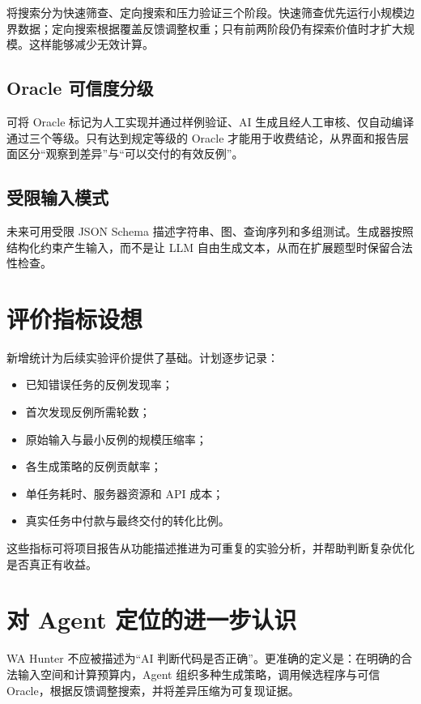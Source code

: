 \documentclass[10pt,a4paper]{ctexart}
\begin{document}
将搜索分为快速筛查、定向搜索和压力验证三个阶段。快速筛查优先运行小规模边界数据；定向搜索根据覆盖反馈调整权重；只有前两阶段仍有探索价值时才扩大规模。这样能够减少无效计算。

\subsection{Oracle 可信度分级}

可将 Oracle 标记为人工实现并通过样例验证、AI 生成且经人工审核、仅自动编译通过三个等级。只有达到规定等级的 Oracle 才能用于收费结论，从界面和报告层面区分“观察到差异”与“可以交付的有效反例”。

\subsection{受限输入模式}

未来可用受限 JSON Schema 描述字符串、图、查询序列和多组测试。生成器按照结构化约束产生输入，而不是让 LLM 自由生成文本，从而在扩展题型时保留合法性检查。

\section{评价指标设想}

新增统计为后续实验评价提供了基础。计划逐步记录：
\begin{itemize}
  \item 已知错误任务的反例发现率；
  \item 首次发现反例所需轮数；
  \item 原始输入与最小反例的规模压缩率；
  \item 各生成策略的反例贡献率；
  \item 单任务耗时、服务器资源和 API 成本；
  \item 真实任务中付款与最终交付的转化比例。
\end{itemize}

这些指标可将项目报告从功能描述推进为可重复的实验分析，并帮助判断复杂优化是否真正有收益。

\section{对 Agent 定位的进一步认识}

WA Hunter 不应被描述为“AI 判断代码是否正确”。更准确的定义是：在明确的合法输入空间和计算预算内，Agent 组织多种生成策略，调用候选程序与可信 Oracle，根据反馈调整搜索，并将差异压缩为可复现证据。
\end{document}
